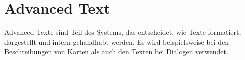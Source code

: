 
\renewcommand{\kapitelautor}{Autor: Felix Zwickelstorfer}
\section{Advanced Text}\label{sec:advanced-text}
\renewcommand{\kapitelautor}{Autor: Felix Zwickelstorfer}

Advanced Texte sind Teil des Systems, das entscheidet, wie Texte formatiert, dargestellt und intern gehandhabt werden.
Es wird beispielsweise bei den Beschreibungen von Karten als auch den Texten bei Dialogen verwendet.



